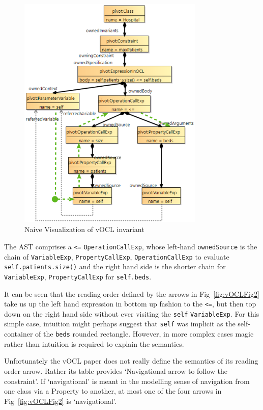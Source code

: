 \documentclass{llncs}
\begin{document}
\begin{figure}
	\vspace{-10pt}
	\begin{center}
		\includegraphics[width=3.5in]{vOCLInvASTOverlay.png}
	\end{center}
	\vspace{-10pt}
	\caption{Naive Visualization of vOCL invariant}
	\label{fig:NaiveInvAST}
	\vspace{-10pt}
\end{figure}

The AST comprises a \verb$<=$ \verb$OperationCallExp$, whose left-hand \verb$ownedSource$ is the chain of \verb$VariableExp$, \verb$PropertyCallExp$, \verb$OperationCallExp$ to evaluate \verb$self.patients.size()$ and the right hand side is the shorter chain for \verb$VariableExp$, \verb$PropertyCallExp$ for \verb$self.beds$.

It can be seen that the reading order defined by the arrows in Fig~\ref{fig:vOCLFig2} take us up the left hand expression in bottom up fashion to the \verb$<=$, but then top down on the right hand side without ever visiting the \verb$self$ \verb$VariableExp$. For this simple case, intuition might perhaps suggest that \verb$self$ was implicit as the self-container of the \verb$beds$ rounded rectangle. However, in more complex cases magic rather than intuition is required to explain the semantics.

Unfortunately the vOCL paper does not really define the semantics of its reading order arrow. Rather its table provides `Navigational arrow to follow the constraint'. If `navigational' is meant in the modelling sense of navigation from one class via a Property to another, at most one of the four arrows in Fig~\ref{fig:vOCLFig2} is `navigational'.
\end{document}
